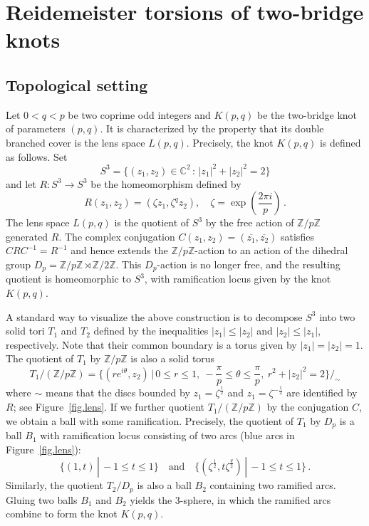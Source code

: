 \documentclass{amsart}
\newcommand{\Z}{\mathbb{Z}}
\newcommand{\C}{\mathbb{C}}
\theoremstyle{definition}
\begin{document}
\section{Reidemeister torsions of two-bridge knots}

\subsection{Topological setting}
\label{sec.top}

Let $0<q<p$ be two coprime odd integers and $K(p,q)$ be the two-bridge knot of parameters $(p,q)$. It is characterized by the property that its double branched cover is the lens space $L(p,q)$.
Precisely, the knot $K(p,q)$ is defined as follows. Set
\begin{equation*}
    S^3=\{(z_1,z_2)\in \C^2 \, : \,  |z_1|^2+|z_2|^2=2\} 
\end{equation*}
and let $R:S^3 \rightarrow S^3$ be the homeomorphism defined by 
\begin{equation*}
    R(z_1,z_2) = (\zeta z_1,\zeta^q z_2), \quad \zeta=\exp \left(\frac{2\pi i}{p} \right) \, .
\end{equation*}
The lens space $L(p,q)$ is the quotient of $S^3$ by the free action of $\Z/p\Z$ generated $R$.
The complex conjugation $C(z_1,z_2)=(\overline{z_1},\overline{z_2})$ satisfies $CRC^{-1}=R^{-1}$ and hence extends the $\Z / p \Z$-action to an action of the dihedral group $D_{p}=\Z/p\Z\rtimes\Z/2\Z$.
This $D_p$-action is no longer free, and the resulting quotient is homeomorphic to $S^3$, with ramification locus given by the knot $K(p,q)$.  


A standard way to visualize the above construction is to decompose $S^3$ into two solid tori $T_1$ and $T_2$ defined by the inequalities $|z_1|\le |z_2|$ and $|z_2|\le |z_1|$, respectively. Note that their common boundary is a torus given by $|z_1|=|z_2|=1$. The quotient of $T_1$ by $\Z/p\Z$ is also a solid torus
\begin{equation*}
    T_1/ ( \Z / p \Z) = \big\{(r e^{i \theta}, z_2) \, \big |\, 0 \leq r \leq 1 , \ -\frac{\pi}{p} \leq \theta \leq \frac{\pi}{p} ,\  r^2 + |z_2|^2 =2 \big\}  /_\sim
\end{equation*}
where $\sim$ means that the discs bounded by $z_1 = \zeta^\frac{1}{2}$ and $z_1 = \zeta^{-\frac{1}{2}}$ are identified by $R$; see Figure~\ref{fig.lens}. If we further quotient $T_1/(\Z / p \Z)$ by the conjugation $C$, we obtain a ball with some ramification. Precisely, the quotient of $T_1$ by $D_p$ is a ball $B_1$ with ramification locus consisting of two arcs (blue arcs in Figure~\ref{fig.lens}):
\begin{equation}
\label{eqn.ramified}
    \{ (1,t) \, | \, -1 \leq t \leq 1\} \quad \text{and} \quad \{ (\zeta^{\frac{1}{2}},t \zeta^{\frac{q}{2}}) \, | \, -1 \leq t \leq 1\}\,.
\end{equation}
Similarly, the quotient $T_2/D_p$ is also a ball $B_2$ containing two ramified arcs. Gluing two balls $B_1$ and $B_2$ yields the 3-sphere, in which the ramified arcs combine to form the knot $K(p,q)$.
\end{document}
